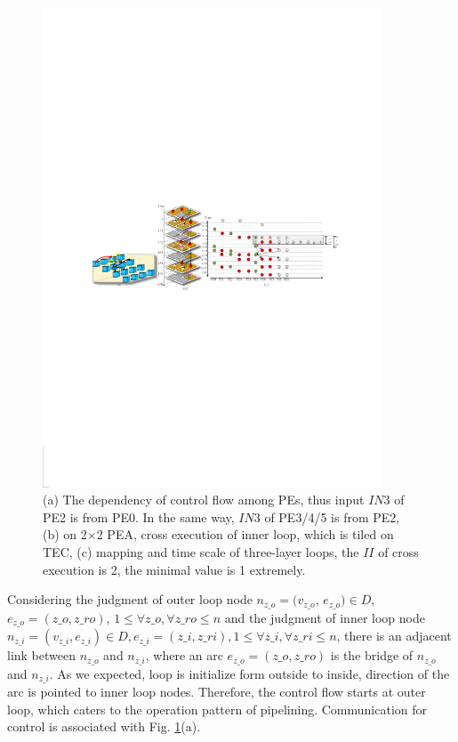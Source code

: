 \documentclass[10pt, conference, compsocconf]{IEEEtran}
\begin{document}
\begin{figure}[!t]
	\centering
	\includegraphics[width=0.9\textwidth]{fi/pe_cfg.pdf}
	\caption{(a) The dependency of control flow among PEs, thus input $IN3$ of PE2 is from PE0. In the same way, $IN3$ of PE3/4/5 is from PE2, (b) on 2$\times$2 PEA, cross execution of inner loop, which is tiled on TEC, (c) mapping and time scale of three-layer loops, the $II$ of cross execution is 2, the minimal value is 1 extremely.}
	\label{fig_pe_cfg}
\end{figure}
Considering the judgment of outer loop node $n_{z\_o}=(v_{z\_o}$, $e_{z\_o}) \in D$, $e_{z\_o}=(z\_o,z\_ro)$, $1 \leq \forall z\_o, \forall z\_ro \leq n$ and the judgment of inner loop node $n_{z\_i}=(v_{z\_i},e_{z\_i}) \in D,e_{z\_i}=(z\_i,z\_ri), 1 \leq \forall z\_i, \forall z\_{ri} \leq n$,  there is an adjacent link between $n_{z\_o}$ and $n_{z\_i}$, where an arc $e_{z\_o}=(z\_o,z\_ro)$ is the bridge of $n_{z\_o}$ and $n_{z\_i}$. As we expected, loop is initialize form outside to inside, direction of the arc is pointed to inner loop nodes. Therefore, the control flow starts at outer loop, which caters to the operation pattern of pipelining. Communication for control is associated with Fig. \ref{fig_pe_cfg}(a).
\end{document}
